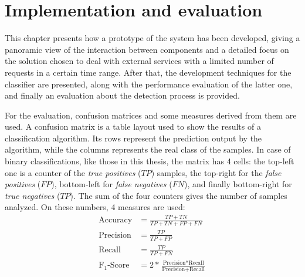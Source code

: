 \chapter{Implementation and evaluation}
\label{cha:results}
This chapter presents how a prototype of the system has been developed, giving a panoramic view of the interaction between components and a detailed focus on the solution chosen to deal with external services with a limited number of requests in a certain time range. After that, the development techniques for the classifier are presented, along with the performance evaluation of the latter one, and finally an evaluation about the detection process is provided.

For the evaluation, confusion matrices and some measures derived from them are used. A confusion matrix is a table layout used to show the results of a classification algorithm. Its rows represent the prediction output by the algorithm, while the columns represents the real class of the samples. In case of binary classifications, like those in this thesis, the matrix has 4 cells: the top-left one is a counter of the \emph{true positives} ($TP$) samples, the top-right for the \emph{false positives} ($FP$), bottom-left for \emph{false negatives} ($FN$), and finally bottom-right for \emph{true negatives} ($TP$). The sum of the four counters gives the number of samples analyzed. On these numbers, 4 measures are used:
\begin{equation*}
\begin{split}
\text{Accuracy} & = \frac{TP + TN}{TP + TN + FP + FN}\\
\text{Precision} & = \frac{TP}{TP + FP} \\ 
\text{Recall} & = \frac{TP}{TP + FN}\\
\text{F}_1\text{-Score} & = 2 * \frac{\text{Precision} * \text{Recall}}{\text{Precision} + \text{Recall}}
\end{split}
\end{equation*}

